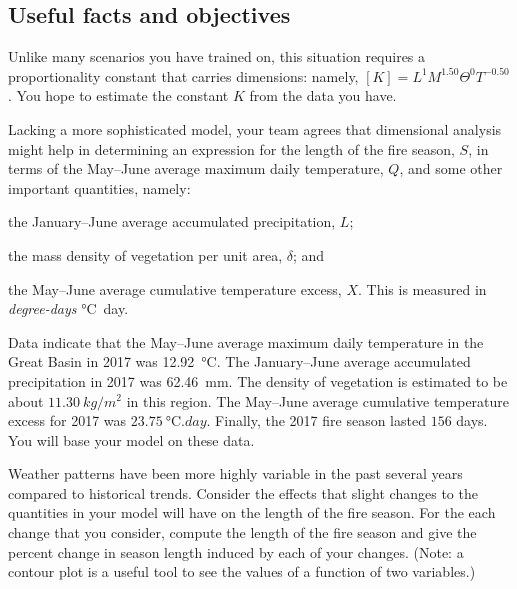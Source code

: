 \documentclass[11pt]{article}\usepackage[]{graphicx}\usepackage[]{color}
\begin{document}
\subsection*{Useful facts and objectives}

    \begin{compactitem}

        \item Unlike many scenarios you have trained on, this situation
        requires a proportionality constant that carries dimensions: namely,
        $[K] = L^{1} M^{1.50} \Theta^{0} T^{-0.50}$.
        You hope to estimate the constant $K$ from the data you have.

        \item Lacking a more sophisticated model, your team agrees that
        dimensional analysis might help in determining an expression for the
        length of the fire season, $S$, in terms of the May--June average
        maximum daily temperature, $Q$, and some other important quantities,
        namely:
        \begin{compactenum}
            \item the January--June average accumulated precipitation, $L$;
            \item the mass density of vegetation per unit area, $\delta$; and
            \item the May--June average cumulative temperature excess, $X$. This
            is measured in \emph{degree-days} \si{\celsius.day}.
        \end{compactenum}

        \item Data indicate that the May--June average maximum daily temperature in
        the Great Basin in 2017 was
        \SI{12.92}{\celsius}. The January--June average
        accumulated precipitation in 2017 was
        \SI{62.46}{mm}. The density of vegetation is
        estimated to be about $\SI{11.30}{kg/m^2}$ in this region.
        The May--June average cumulative temperature excess for 2017 was
        $\SI{23.75}{\celsius.day}$. Finally, the 2017 fire season
        lasted $\num{156}$ days. You will base your model on these
        data.

        \item Weather patterns have been more highly variable in the past several years
        compared to historical trends. Consider the effects that slight changes to the
        quantities in your model will have on the length of the fire season. For the
        each change that you consider, compute the length of the fire season and give the
        percent change in season length induced by each of your changes. (Note: a contour
        plot is a useful tool to see the values of a function of two variables.)

    \end{compactitem}
\end{document}
